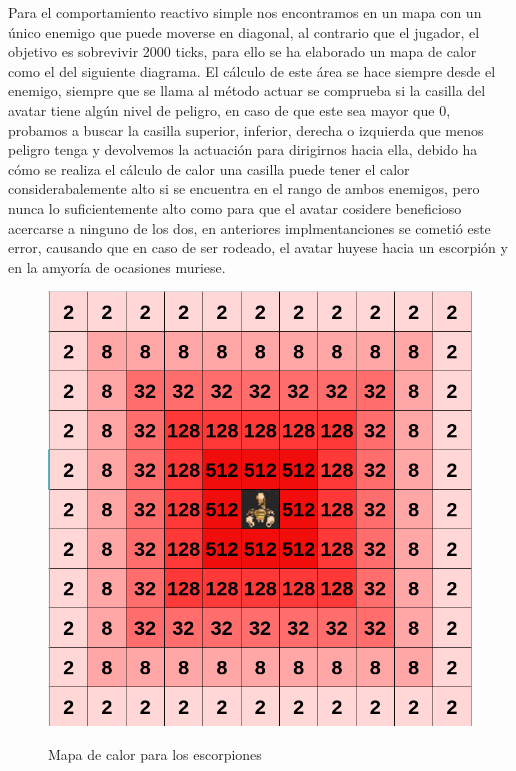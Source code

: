 Para el comportamiento reactivo simple nos encontramos en un mapa con un único enemigo que puede moverse en diagonal, al contrario que el jugador, el objetivo es sobrevivir 2000 ticks, para ello se ha elaborado un mapa de calor como el del siguiente diagrama. El cálculo de este área se hace siempre desde el enemigo, siempre que se llama al método actuar se comprueba si la casilla del avatar tiene algún nivel de peligro, en caso de que este sea mayor que 0, probamos a buscar la casilla superior, inferior, derecha o izquierda que menos peligro tenga y devolvemos la actuación para dirigirnos hacia ella, debido ha cómo se realiza el cálculo de calor una casilla puede tener el calor considerabalemente alto si se encuentra en el rango de ambos enemigos, pero nunca lo suficientemente alto como para que el avatar cosidere beneficioso acercarse a ninguno de los dos, en anteriores implmentanciones se cometió este error, causando que en caso de ser rodeado, el avatar huyese hacia un escorpión y en la amyoría de ocasiones muriese.

\begin{figure}[H]
    \caption{Mapa de calor para los escorpiones}
    \centering
	 \includegraphics[scale=0.25]{Escorpiones.png}
    \label{fig:label}
\end{figure}

